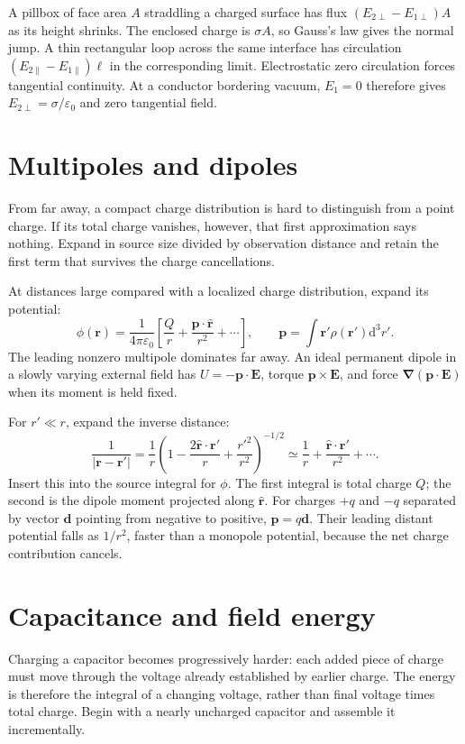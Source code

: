 \documentclass[11pt,oneside]{book}
\newcommand{\dd}{\mathrm{d}}
\newcommand{\vect}[1]{\boldsymbol{#1}}
\newcommand{\grad}{\boldsymbol{\nabla}}
\newcommand{\eps}{\varepsilon_0}
\theoremstyle{reviewstyle}
\begin{document}
A pillbox of face area $A$ straddling a charged surface has flux $(E_{2\perp}-E_{1\perp})A$ as its height shrinks. The enclosed charge is $\sigma A$, so Gauss's law gives the normal jump. A thin rectangular loop across the same interface has circulation $(E_{2\parallel}-E_{1\parallel})\ell$ in the corresponding limit. Electrostatic zero circulation forces tangential continuity. At a conductor bordering vacuum, $E_{1}=0$ therefore gives $E_{2\perp}=\sigma/\eps$ and zero tangential field.

\section{Multipoles and dipoles}
From far away, a compact charge distribution is hard to distinguish from a point charge. If its total charge vanishes, however, that first approximation says nothing. Expand in source size divided by observation distance and retain the first term that survives the charge cancellations.

At distances large compared with a localized charge distribution, expand its potential:
\begin{equation}
\phi(\vect r)=\frac1{4\pi\eps}\left[\frac Qr+\frac{\vect p\cdot\hat{\vect r}}{r^2}+\cdots\right],\qquad
\vect p=\int\vect r'\rho(\vect r')\dd^3r'.
\end{equation}
The leading nonzero multipole dominates far away. An ideal permanent dipole in a slowly varying external field has $U=-\vect p\cdot\vect E$, torque $\vect p\times\vect E$, and force $\grad(\vect p\cdot\vect E)$ when its moment is held fixed.

For $r'\ll r$, expand the inverse distance:
\begin{equation}
\frac1{|\vect r-\vect r'|}
=\frac1r\left(1-\frac{2\hat{\vect r}\cdot\vect r'}r+\frac{r'^2}{r^2}\right)^{-1/2}
\simeq\frac1r+\frac{\hat{\vect r}\cdot\vect r'}{r^2}+\cdots.
\end{equation}
Insert this into the source integral for $\phi$. The first integral is total charge $Q$; the second is the dipole moment projected along $\hat{\vect r}$. For charges $+q$ and $-q$ separated by vector $\vect d$ pointing from negative to positive, $\vect p=q\vect d$. Their leading distant potential falls as $1/r^2$, faster than a monopole potential, because the net charge contribution cancels.

\section{Capacitance and field energy}
Charging a capacitor becomes progressively harder: each added piece of charge must move through the voltage already established by earlier charge. The energy is therefore the integral of a changing voltage, rather than final voltage times total charge. Begin with a nearly uncharged capacitor and assemble it incrementally.
\end{document}
